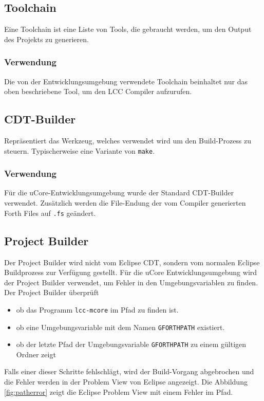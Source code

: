 \subsection{Toolchain}
Eine Toolchain ist eine Liste von Tools, die gebraucht werden, um den Output des Projekts zu generieren. 

\subsubsection{Verwendung}
Die von der Entwicklungsumgebung verwendete Toolchain beinhaltet nur das oben beschriebene Tool, um den LCC Compiler aufzurufen.

\subsection{CDT-Builder}
Repräsentiert das Werkzeug, welches verwendet wird um den Build-Prozess zu steuern. Typischerweise eine Variante von \verb!make!. 

\subsubsection{Verwendung}
Für die uCore-Entwicklungsumgebung wurde der Standard CDT-Builder verwendet. Zusätzlich werden die File-Endung der vom Compiler generierten Forth Files auf \verb!.fs! geändert.

\subsection{Project Builder}
Der Project Builder wird nicht vom Eclipse CDT, sondern vom normalen Eclipse Buildprozess zur Verfügung gestellt. Für die uCore Entwicklungsumgebung wird der Project Builder verwendet, um Fehler in den Umgebungsvariablen zu finden. Der Project Builder überprüft
%
\begin{itemize}
  \item ob das Programm \verb!lcc-mcore! im Pfad zu finden ist.
  \item ob eine Umgebungsvariable mit dem Namen \verb!GFORTHPATH! existiert.
  \item ob der letzte Pfad der Umgebungsvariable \verb!GFORTHPATH! zu einem gültigen Ordner zeigt
\end{itemize}
%
Falls einer dieser Schritte fehlschlägt, wird der Build-Vorgang abgebrochen und die Fehler werden in der Problem View von Eclipse angezeigt. Die Abbildung \ref{fig:patherror} zeigt die Eclipse Problem View mit einem Fehler im Pfad.

